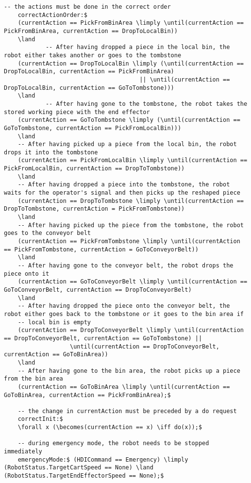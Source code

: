\begin{lstlisting}[fontadjust, mathescape, frame=tlb]
    -- the actions must be done in the correct order
    correctActionOrder:$
    (currentAction == PickFromBinArea \limply \until(currentAction == PickFromBinArea, currentAction == DropToLocalBin))
    \land
            -- After having dropped a piece in the local bin, the robot either takes another or goes to the tombstone
    (currentAction == DropToLocalBin \limply (\until(currentAction == DropToLocalBin, currentAction == PickFromBinArea)
                                       || \until(currentAction == DropToLocalBin, currentAction == GoToTombstone)))
    \land
            -- After having gone to the tombstone, the robot takes the stored working piece with the end effector
    (currentAction == GoToTombstone \limply (\until(currentAction == GoToTombstone, currentAction == PickFromLocalBin)))
    \land
    -- After having picked up a piece from the local bin, the robot drops it into the tombstone
    (currentAction == PickFromLocalBin \limply \until(currentAction == PickFromLocalBin, currentAction == DropToTombstone))
    \land
    -- After having dropped a piece into the tombstone, the robot waits for the operator's signal and then picks up the reshaped piece
    (currentAction == DropToTombstone \limply \until(currentAction == DropToTombstone, currentAction = PickFromTombstone))
    \land
    -- After having picked up the piece from the tombstone, the robot goes to the conveyor belt
    (currentAction == PickFromTombstone \limply \until(currentAction == PickFromTombstone, currentAction = GoToConveyorBelt))
    \land
    -- After having gone to the conveyor belt, the robot drops the piece onto it
    (currentAction == GoToConveyorBelt \limply \until(currentAction == GoToConveyorBelt, currentAction == DropToConveyorBelt)
    \land
    -- After having dropped the piece onto the conveyor belt, the robot either goes back to the tombstone or it goes to the bin area if 
    -- local bin is empty
    (currentAction == DropToConveyorBelt \limply \until(currentAction == DropToConveyorBelt, currentAction == GoToTombstone) ||
                   \until(currentAction == DropToConveyorBelt, currentAction == GoToBinArea))
    \land
    -- After having gone to the bin area, the robot picks up a piece from the bin area
    (currentAction == GoToBinArea \limply \until(currentAction == GoToBinArea, currentAction == PickFromBinArea);$

    -- the change in currentAction must be preceded by a do request
    correctInit:$
    \forall x (\becomes(currentAction == x) \iff do(x));$

    -- during emergency mode, the robot needs to be stopped immediately
    emergencyMode:$ (HDICommand == Emergency) \limply (RobotStatus.TargetCartSpeed == None) \land (RobotStatus.TargetEndEffectorSpeed == None);$


\end{lstlisting}
